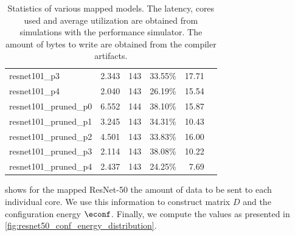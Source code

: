 \begin{table}[hbtp]
\begin{tabular}{@{}lrrrrr@{}}
resnet101\_p3           & 2.343                                                           & 143            & 33.55\%            & 17.71                                                             \\
resnet101\_p4           & 2.040                                                           & 143            & 26.19\%            & 15.54                                                             \\
resnet101\_pruned\_p0   & 6.552                                                           & 144            & 38.10\%            & 15.87                                                             \\
resnet101\_pruned\_p1   & 3.245                                                           & 143            & 34.31\%            & 10.43                                                             \\
resnet101\_pruned\_p2   & 4.501                                                           & 143            & 33.83\%            & 16.00                                                             \\
resnet101\_pruned\_p3   & 2.114                                                           & 143            & 38.08\%            & 10.22                                                             \\
resnet101\_pruned\_p4   & 2.437                                                           & 143            & 24.25\%            & 7.69                                                              \\
\bottomrule
\end{tabular}
\caption{
    Statistics of various mapped models.
    The latency, cores used and average utilization are obtained from simulations with the performance simulator.
    The amount of bytes to write are obtained from the compiler artifacts.
}
\label{tab:example_models_stats}
\end{table}


 shows for the mapped ResNet-50 the amount of data to be sent to each individual core.
We use this information to construct matrix $D$ and the configuration energy $\econf$.
Finally, we compute the values as presented in \cref{fig:resnet50_conf_energy_distribution}.

